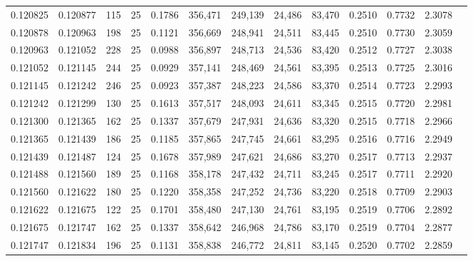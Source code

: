 \begin{tabular}{rrrrrrrrrrrrr}
0.120825 & 0.120877 &   115 &  25 &                                     0.1786 & 356,471 & 249,139 &  24,486 &  83,470 & 0.2510 & 0.7732 & 2.3078 \\
0.120878 & 0.120963 &   198 &  25 &                                     0.1121 & 356,669 & 248,941 &  24,511 &  83,445 & 0.2510 & 0.7730 & 2.3059 \\
0.120963 & 0.121052 &   228 &  25 &                                     0.0988 & 356,897 & 248,713 &  24,536 &  83,420 & 0.2512 & 0.7727 & 2.3038 \\
0.121052 & 0.121145 &   244 &  25 &                                     0.0929 & 357,141 & 248,469 &  24,561 &  83,395 & 0.2513 & 0.7725 & 2.3016 \\
0.121145 & 0.121242 &   246 &  25 &                                     0.0923 & 357,387 & 248,223 &  24,586 &  83,370 & 0.2514 & 0.7723 & 2.2993 \\
0.121242 & 0.121299 &   130 &  25 &                                     0.1613 & 357,517 & 248,093 &  24,611 &  83,345 & 0.2515 & 0.7720 & 2.2981 \\
0.121300 & 0.121365 &   162 &  25 &                                     0.1337 & 357,679 & 247,931 &  24,636 &  83,320 & 0.2515 & 0.7718 & 2.2966 \\
0.121365 & 0.121439 &   186 &  25 &                                     0.1185 & 357,865 & 247,745 &  24,661 &  83,295 & 0.2516 & 0.7716 & 2.2949 \\
0.121439 & 0.121487 &   124 &  25 &                                     0.1678 & 357,989 & 247,621 &  24,686 &  83,270 & 0.2517 & 0.7713 & 2.2937 \\
0.121488 & 0.121560 &   189 &  25 &                                     0.1168 & 358,178 & 247,432 &  24,711 &  83,245 & 0.2517 & 0.7711 & 2.2920 \\
0.121560 & 0.121622 &   180 &  25 &                                     0.1220 & 358,358 & 247,252 &  24,736 &  83,220 & 0.2518 & 0.7709 & 2.2903 \\
0.121622 & 0.121675 &   122 &  25 &                                     0.1701 & 358,480 & 247,130 &  24,761 &  83,195 & 0.2519 & 0.7706 & 2.2892 \\
0.121675 & 0.121747 &   162 &  25 &                                     0.1337 & 358,642 & 246,968 &  24,786 &  83,170 & 0.2519 & 0.7704 & 2.2877 \\
0.121747 & 0.121834 &   196 &  25 &                                     0.1131 & 358,838 & 246,772 &  24,811 &  83,145 & 0.2520 & 0.7702 & 2.2859 \\

\end{tabular}
